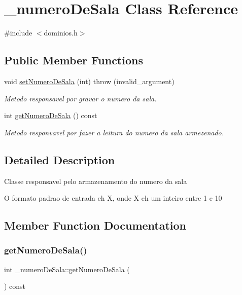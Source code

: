 \hypertarget{class__numero_de_sala}{}\section{\+\_\+numero\+De\+Sala Class Reference}
\label{class__numero_de_sala}


{\ttfamily \#include $<$dominios.\+h$>$}

\subsection*{Public Member Functions}
\begin{DoxyCompactItemize}
\item 
void \mbox{\hyperlink{class__numero_de_sala_a06170bd2313e32c17f0a4e212c283f33}{set\+Numero\+De\+Sala}} (int)  throw (invalid\+\_\+argument)
\begin{DoxyCompactList}\small\item\em Metodo responsavel por gravar o numero da sala. \end{DoxyCompactList}\item 
int \mbox{\hyperlink{class__numero_de_sala_a878144bb6ff84dbea85affc8016e31a4}{get\+Numero\+De\+Sala}} () const
\begin{DoxyCompactList}\small\item\em Metodo responvavel por fazer a leitura do numero da sala armezenado. \end{DoxyCompactList}\end{DoxyCompactItemize}


\subsection{Detailed Description}
Classe responsavel pelo armazenamento do numero da sala

O formato padrao de entrada eh X, onde X eh um inteiro entre 1 e 10 

\subsection{Member Function Documentation}
\mbox{\label{class__numero_de_sala_a878144bb6ff84dbea85affc8016e31a4}} 
\subsubsection{\texorpdfstring{getNumeroDeSala()}{getNumeroDeSala()}}
{\footnotesize\ttfamily int \+\_\+numero\+De\+Sala\+::get\+Numero\+De\+Sala (\begin{DoxyParamCaption}{ }\end{DoxyParamCaption}) const\hspace{0.3cm}{\ttfamily [inline]}}



